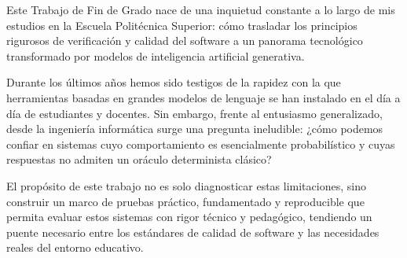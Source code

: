 Este Trabajo de Fin de Grado nace de una inquietud constante a lo largo de mis estudios en la Escuela Politécnica Superior: cómo trasladar los principios rigurosos de verificación y calidad del software a un panorama tecnológico transformado por modelos de inteligencia artificial generativa.

Durante los últimos años hemos sido testigos de la rapidez con la que herramientas basadas en grandes modelos de lenguaje se han instalado en el día a día de estudiantes y docentes. Sin embargo, frente al entusiasmo generalizado, desde la ingeniería informática surge una pregunta ineludible: ¿cómo podemos confiar en sistemas cuyo comportamiento es esencialmente probabilístico y cuyas respuestas no admiten un oráculo determinista clásico?

El propósito de este trabajo no es solo diagnosticar estas limitaciones, sino construir un marco de pruebas práctico, fundamentado y reproducible que permita evaluar estos sistemas con rigor técnico y pedagógico, tendiendo un puente necesario entre los estándares de calidad de software y las necesidades reales del entorno educativo.

